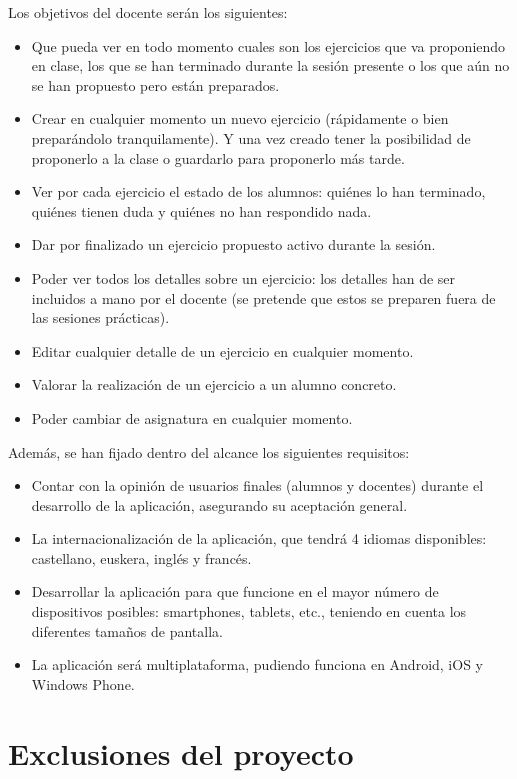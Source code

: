 Los objetivos del docente serán los siguientes:

\begin{itemize}
\item Que pueda ver en todo momento cuales son los ejercicios que va proponiendo en clase, los que se han terminado durante la sesión presente o los que aún no se han propuesto pero están preparados.
\item Crear en cualquier momento un nuevo ejercicio (rápidamente o bien preparándolo tranquilamente). Y una vez creado tener la posibilidad de proponerlo a la clase o guardarlo para proponerlo más tarde.
\item Ver por cada ejercicio el estado de los alumnos: quiénes lo han terminado, quiénes tienen duda y quiénes no han respondido nada.
\item Dar por finalizado un ejercicio propuesto activo durante la sesión.
\item Poder ver todos los detalles sobre un ejercicio: los detalles han de ser incluidos a mano por el docente (se pretende que estos se preparen fuera de las sesiones prácticas).
\item Editar cualquier detalle de un ejercicio en cualquier momento.
\item Valorar la realización de un ejercicio a un alumno concreto.
\item Poder cambiar de asignatura en cualquier momento.
\end{itemize}

Además, se han fijado dentro del alcance los siguientes requisitos:

\begin{itemize}
\item Contar con la opinión de usuarios finales (alumnos y docentes) durante el desarrollo de la aplicación, asegurando su aceptación general.
\item La internacionalización de la aplicación, que tendrá 4 idiomas disponibles: castellano, euskera, inglés y francés.
\item Desarrollar la aplicación para que funcione en el mayor número de dispositivos posibles: smartphones, tablets, etc., teniendo en cuenta los diferentes tamaños de pantalla.
\item La aplicación será multiplataforma, pudiendo funciona en Android, iOS y Windows Phone.
\end{itemize}

\section{Exclusiones del proyecto}

